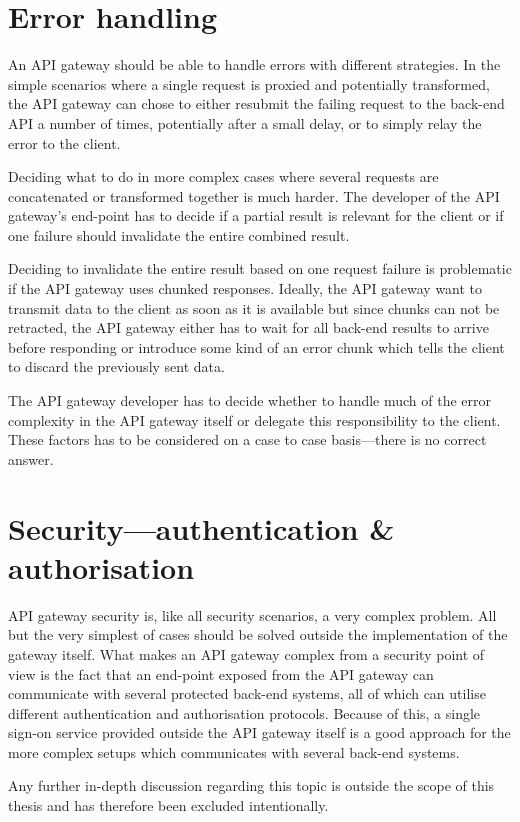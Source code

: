 \documentclass{cslthse-msc}
\begin{document}
\section{Error handling}
An API gateway should be able to handle errors with different strategies. In the simple scenarios where a single request is proxied and potentially transformed, the API gateway can chose to either resubmit the failing request to the back-end API a number of times, potentially after a small delay, or to simply relay the error to the client.

Deciding what to do in more complex cases where several requests are concatenated or transformed together is much harder. The developer of the API gateway's end-point has to decide if a partial result is relevant for the client or if one failure should invalidate the entire combined result.

Deciding to invalidate the entire result based on one request failure is problematic if the API gateway uses chunked responses. Ideally, the API gateway want to transmit data to the client as soon as it is available but since chunks can not be retracted, the API gateway either has to wait for all back-end results to arrive before responding or introduce some kind of an error chunk which tells the client to discard the previously sent data.

The API gateway developer has to decide whether to handle much of the error complexity in the API gateway itself or delegate this responsibility to the client. These factors has to be considered on a case to case basis---there is no correct answer.

\section{Security---authentication \& authorisation}
\label{sec:security}
API gateway security is, like all security scenarios, a very complex problem. All but the very simplest of cases should be solved outside the implementation of the gateway itself. What makes an API gateway complex from a security point of view is the fact that an end-point exposed from the API gateway can communicate with several protected back-end systems, all of which can utilise different authentication and authorisation protocols. Because of this, a single sign-on service provided outside the API gateway itself is a good approach for the more complex setups which communicates with several back-end systems.

Any further in-depth discussion regarding this topic is outside the scope of this thesis and has therefore been excluded intentionally.
\end{document}
